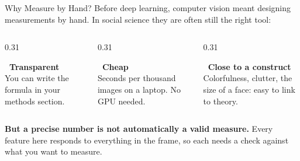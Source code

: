 \newcommand{\coursemodule}{Module 03}





\begin{frame}{Why Measure by Hand?}
Before deep learning, computer vision meant designing measurements by hand. In social science
they are often still the right tool:

\vspace{0.1cm}
\begin{columns}[T]
\begin{column}{0.31\textwidth}
\begin{greenbox}[height=2.3cm]
\textbf{\faFileImage\ Transparent}\\
You can write the formula in your methods section.
\end{greenbox}
\end{column}
\begin{column}{0.31\textwidth}
\begin{greenbox}[height=2.3cm]
\raggedright\textbf{\faMicrochip\ Cheap}\\
Seconds per thousand images on a laptop. No GPU needed.
\end{greenbox}
\end{column}
\begin{column}{0.31\textwidth}
\begin{greenbox}[height=2.3cm]
\raggedright\textbf{\faRuler\ Close to a construct}\\
Colorfulness, clutter, the size of a face: easy to link to theory.
\end{greenbox}
\end{column}
\end{columns}

\begin{warnbox}
\textbf{But a precise number is not automatically a valid measure.} Every feature here responds
to everything in the frame, so each needs a check against what you want to measure.
\end{warnbox}
\end{frame}

